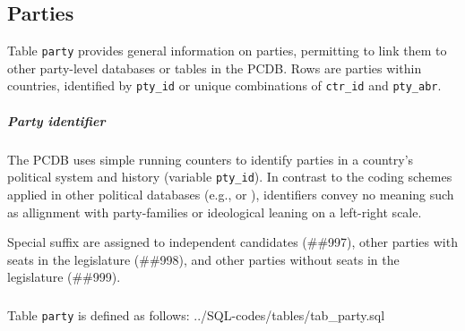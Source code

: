 \subsection{Parties}\label{subsec_tab_party}

Table \texttt{party} provides general information on parties, permitting to link them to other party-level databases or tables in the PCDB. 
Rows are parties within countries, identified by \texttt{pty\_id} or unique combinations of \texttt{ctr\_id} and \texttt{pty\_abr}.

\subparagraph{Party identifier}
The PCDB uses simple running counters to identify parties in a country's political system and history (variable \texttt{pty\_id}).
In contrast to the coding schemes applied in other political databases (e.g., \citealt{ManifestoData2013} or \citealt{ParlGov2012}), identifiers convey no meaning such as allignment with party-families or ideological leaning on a left-right scale.

Special suffix are assigned to
independent candidates (\#\#997), 
other parties with seats in the legislature (\#\#998), and 
other parties without seats in the legislature (\#\#999).
  
\subparagraph{}
Table \texttt{party} is defined as follows: 
%
{../SQL-codes/tables/tab_party.sql}



